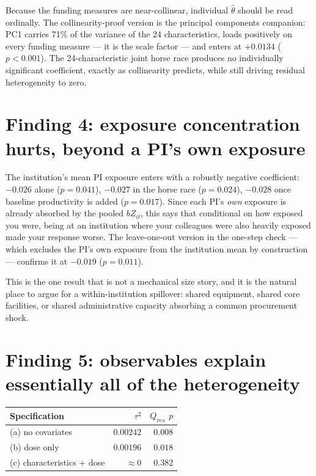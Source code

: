\documentclass[11pt]{article}
\begin{document}
\noindent
Because the funding measures are near-collinear, individual $\hat\theta$
should be read ordinally. The collinearity-proof version is the principal
components companion: PC1 carries 71\% of the variance of the 24
characteristics, loads positively on every funding measure --- it is the scale
factor --- and enters at $+0.0134$ ($p < 0.001$). The 24-characteristic joint
horse race produces no individually significant coefficient, exactly as
collinearity predicts, while still driving residual heterogeneity to zero.

\section{Finding 4: exposure concentration hurts, beyond a PI's own exposure}

The institution's mean PI exposure enters with a robustly negative
coefficient: $-0.026$ alone ($p = 0.041$), $-0.027$ in the horse race
($p = 0.024$), $-0.028$ once baseline productivity is added ($p = 0.017$).
Since each PI's \emph{own} exposure is already absorbed by the pooled $b
Z_{it}$, this says that conditional on how exposed you were, being at an
institution where your colleagues were also heavily exposed made your
response worse. The leave-one-out version in the one-step check --- which
excludes the PI's own exposure from the institution mean by construction ---
confirms it at $-0.019$ ($p = 0.011$).

This is the one result that is not a mechanical size story, and it is the
natural place to argue for a within-institution spillover: shared equipment,
shared core facilities, or shared administrative capacity absorbing a common
procurement shock.

\section{Finding 5: observables explain essentially all of the heterogeneity}

\begin{center}
\begin{tabular}{@{}lrr@{}}
\toprule
Specification & $\tau^2$ & $Q_{res}$ $p$ \\
\midrule
(a) no covariates          & $0.00242$ & $0.008$ \\
(b) dose only              & $0.00196$ & $0.018$ \\
(c) characteristics + dose & $\approx 0$ & $0.382$ \\
\bottomrule
\end{tabular}
\end{center}
\end{document}
